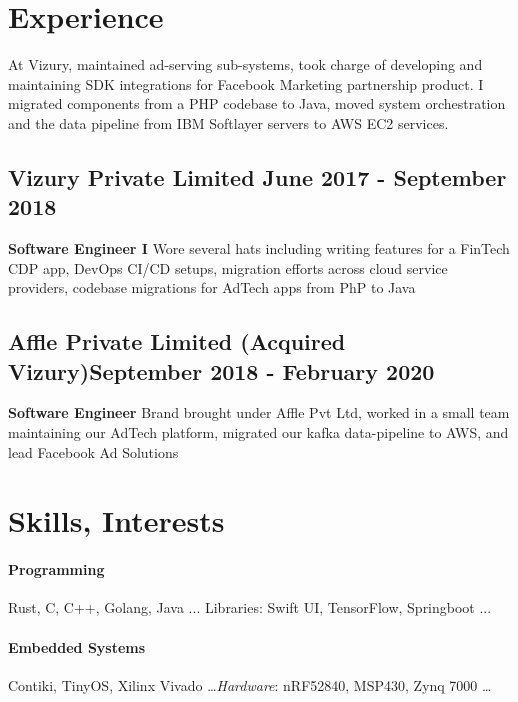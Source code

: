\documentclass{scrartcl}
\begin{document}
	\section{Experience}

	At Vizury, maintained ad-serving sub-systems, took charge of developing and maintaining SDK integrations for Facebook Marketing partnership product. I migrated components from a PHP codebase to Java, moved system orchestration and the data pipeline from IBM Softlayer servers to AWS EC2 services.

		\subsection[Vizury]{Vizury Private Limited \hfill {\normalfont June 2017 - September 2018}}
		\textbf{Software Engineer I}
		Wore several hats including writing features for a FinTech CDP app, DevOps CI/CD setups, migration efforts across cloud service providers, codebase migrations for AdTech apps from PhP to Java

		\subsection[Affle]{Affle Private Limited (Acquired Vizury)\hfill {\normalfont September 2018 - February 2020}}
		\textbf{Software Engineer}
		Brand brought under Affle Pvt Ltd, worked in a small team maintaining our AdTech platform, migrated our kafka data-pipeline to AWS, and lead Facebook Ad Solutions


		\section{Skills, Interests}
		\paragraph{Programming}{ Rust, C, C++, Golang, Java ... Libraries: Swift UI, TensorFlow, Springboot ...}

		\paragraph{Embedded Systems}{ Contiki, TinyOS, Xilinx Vivado \dots \textit{Hardware}: nRF52840, MSP430, Zynq 7000 \dots} %
\end{document}
